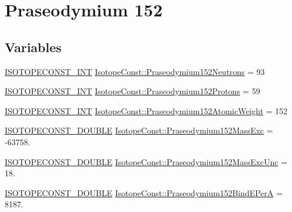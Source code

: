 \hypertarget{group___isotope_const-_praseodymium-_pr152}{}\section{Praseodymium 152}
\label{group___isotope_const-_praseodymium-_pr152}
\subsection*{Variables}
\begin{DoxyCompactItemize}
\item 
\mbox{\hyperlink{group___isotope_const-_macros_ga5f18360b3e99483a35c32d789e62621c}{I\+S\+O\+T\+O\+P\+E\+C\+O\+N\+S\+T\+\_\+\+I\+NT}} \mbox{\hyperlink{group___isotope_const-_praseodymium-_pr152_ga83ce46850927a78f9a5c0f0cecee359e}{Isotope\+Const\+::\+Praseodymium152\+Neutrons}} = 93
\item 
\mbox{\hyperlink{group___isotope_const-_macros_ga5f18360b3e99483a35c32d789e62621c}{I\+S\+O\+T\+O\+P\+E\+C\+O\+N\+S\+T\+\_\+\+I\+NT}} \mbox{\hyperlink{group___isotope_const-_praseodymium-_pr152_gaf8b433907e3bca82b1f12628fd10e715}{Isotope\+Const\+::\+Praseodymium152\+Protons}} = 59
\item 
\mbox{\hyperlink{group___isotope_const-_macros_ga5f18360b3e99483a35c32d789e62621c}{I\+S\+O\+T\+O\+P\+E\+C\+O\+N\+S\+T\+\_\+\+I\+NT}} \mbox{\hyperlink{group___isotope_const-_praseodymium-_pr152_gacf8d2d526d2e41c6aca81bfef99124e8}{Isotope\+Const\+::\+Praseodymium152\+Atomic\+Weight}} = 152
\item 
\mbox{\hyperlink{group___isotope_const-_macros_ga8f45a7272ce02c0b4c65c44636ed719a}{I\+S\+O\+T\+O\+P\+E\+C\+O\+N\+S\+T\+\_\+\+D\+O\+U\+B\+LE}} \mbox{\hyperlink{group___isotope_const-_praseodymium-_pr152_ga52c4c7fe3a24ce974af356292fead9ad}{Isotope\+Const\+::\+Praseodymium152\+Mass\+Exc}} = -\/63758.
\item 
\mbox{\hyperlink{group___isotope_const-_macros_ga8f45a7272ce02c0b4c65c44636ed719a}{I\+S\+O\+T\+O\+P\+E\+C\+O\+N\+S\+T\+\_\+\+D\+O\+U\+B\+LE}} \mbox{\hyperlink{group___isotope_const-_praseodymium-_pr152_gae1c86f105825f520e69df985a44cc7ff}{Isotope\+Const\+::\+Praseodymium152\+Mass\+Exc\+Unc}} = 18.
\item 
\mbox{\hyperlink{group___isotope_const-_macros_ga8f45a7272ce02c0b4c65c44636ed719a}{I\+S\+O\+T\+O\+P\+E\+C\+O\+N\+S\+T\+\_\+\+D\+O\+U\+B\+LE}} \mbox{\hyperlink{group___isotope_const-_praseodymium-_pr152_ga9d095ee5a9f0cef836fb4c4c0d6c187b}{Isotope\+Const\+::\+Praseodymium152\+Bind\+E\+PerA}} = 8187.

\end{DoxyCompactItemize}
